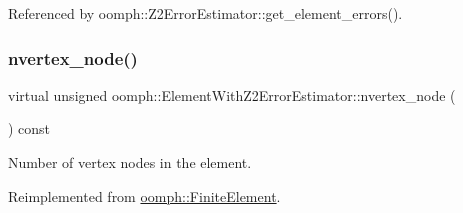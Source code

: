 Referenced by oomph\+::\+Z2\+Error\+Estimator\+::get\+\_\+element\+\_\+errors().

\mbox{\label{classoomph_1_1ElementWithZ2ErrorEstimator_a19495a0e77ef4ff35f15fdf7913b4077}} 
\subsubsection{\texorpdfstring{nvertex\+\_\+node()}{nvertex\_node()}}
{\footnotesize\ttfamily virtual unsigned oomph\+::\+Element\+With\+Z2\+Error\+Estimator\+::nvertex\+\_\+node (\begin{DoxyParamCaption}{ }\end{DoxyParamCaption}) const\hspace{0.3cm}{\ttfamily [pure virtual]}}



Number of vertex nodes in the element. 



Reimplemented from \hyperlink{classoomph_1_1FiniteElement_a45631a7aa50efc3123a921d114f84cba}{oomph\+::\+Finite\+Element}.



